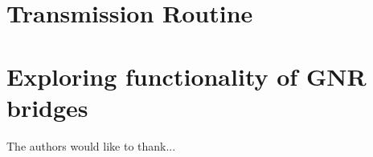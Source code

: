\documentclass[aps, prb, a4paper, english, 12pt, onecolumn, longbibliography, amsmath, amssymb, colorinlistoftodos, floatfix, svgnames]{revtex4-2}
\numberwithin{equation}{section}
\begin{document}
\section{Transmission Routine}\label{transec}

\section{Exploring functionality of GNR bridges}\label{testsec}

\newpage
\begin{acknowledgments}
	The authors would like to thank...
\end{acknowledgments}
\onecolumngrid


\newpage
\listoffigures
\listoftables
\listoflistings
\newpage

\end{document}

